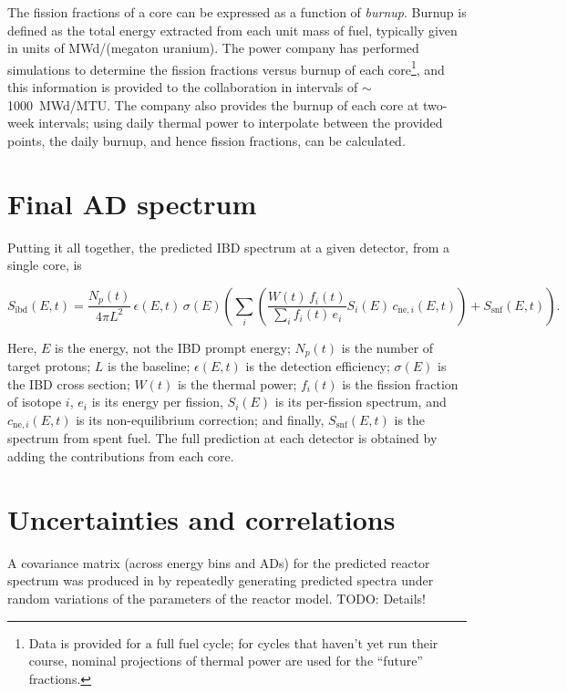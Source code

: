 \documentclass[../thesis.tex]{subfiles}
\begin{document}
The fission fractions of a core can be expressed as a function of \emph{burnup}. Burnup is defined as the total energy extracted from each unit mass of fuel, typically given in units of MWd/(megaton uranium). The power company has performed simulations to determine the fission fractions versus burnup of each core\footnote{Data is provided for a full fuel cycle; for cycles that haven't yet run their course, nominal projections of thermal power are used for the ``future'' fractions.}, and this information is provided to the collaboration in intervals of $\sim$1000~MWd/MTU. The company also provides the burnup of each core at two-week intervals; using daily thermal power to interpolate between the provided points, the daily burnup, and hence fission fractions, can be calculated.


\section{Final AD spectrum}
\label{sec:adspectra}

Putting it all together, the predicted IBD spectrum at a given detector, from a single core, is

\begin{samepage}
  \[ S_{\mathrm{ibd}}(E, t) = \frac{N_p(t)}{4\pi L^2} \, \epsilon(E, t) \,
    \sigma(E) \left( \sum_i \left( \frac{W(t) \, f_i(t)}{\sum_i f_i(t) \, e_i}
        S_i(E) \, c_{\mathrm{ne},i}(E, t) \right) + S_{\mathrm{snf}}(E, t)
    \right). \]

  Here, $E$ is the \nubar energy, not the IBD prompt energy; $N_p(t)$ is the number of target protons; $L$ is the baseline; $\epsilon(E, t)$ is the detection efficiency; $\sigma(E)$ is the IBD cross section; $W(t)$ is the thermal power; $f_i(t)$ is the fission fraction of isotope $i$, $e_i$ is its energy per fission, $S_i(E)$ is its per-fission spectrum, and $c_{\mathrm{ne},i}(E, t)$ is its non-equilibrium correction; and finally, $S_\mathrm{snf}(E, t)$ is the spectrum from spent fuel. The full prediction at each detector is obtained by adding the contributions from each core.
\end{samepage}

\section{Uncertainties and correlations}
\label{sec:reacunccorr}

A covariance matrix (across energy bins and ADs) for the predicted reactor spectrum was produced in \cite{Lewis} by repeatedly generating predicted spectra under random variations of the parameters of the reactor model. TODO: Details!
\end{document}
